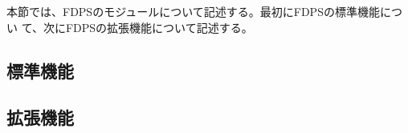 本節では、FDPSのモジュールについて記述する。最初にFDPSの標準機能につい
て、次にFDPSの拡張機能について記述する。

\subsection{標準機能}



\subsection{拡張機能}



